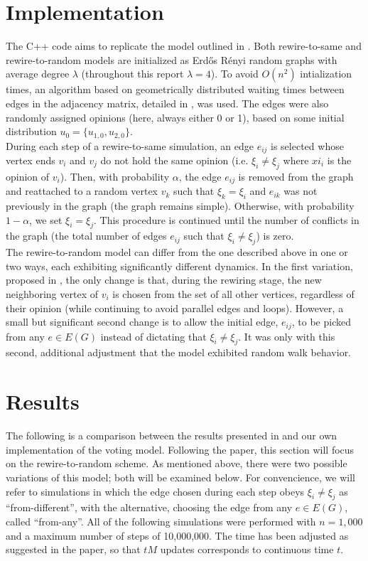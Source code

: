 \documentclass[11pt]{article}
\begin{document}
\section*{Implementation}
The C++ code aims to replicate the model outlined in \cite{durret:pnas12}. Both rewire-to-same and rewire-to-random models are initialized as Erd\H{o}s R\'{e}nyi random graphs with average degree $\lambda$ (throughout this report $\lambda = 4$). To avoid $O(n^{2})$ intialization times, an algorithm based on geometrically distributed waiting times between edges in the adjacency matrix, detailed in \cite{?}, was used. The edges were also randomly assigned opinions (here, always either 0 or 1), based on some initial distribution $u_{0}=\{u_{1,0},u_{2,0}\}$. \\[1pt]
\indent During each step of a rewire-to-same simulation, an edge $e_{ij}$ is selected whose vertex ends $v_{i}$ and $v_{j}$ do not hold the same opinion (i.e. $\xi_{i}\neq\xi_{j}$ where $xi_{i}$ is the opinion of $v_{i}$). Then, with probability $\alpha$, the edge $e_{ij}$ is removed from the graph and reattached to a random vertex $v_{k}$ such that $\xi_{k}=\xi_{i}$ and $e_{ik}$ was not previously in the graph (the graph remains simple). Otherwise, with probability $1-\alpha$, we set $\xi_{i}=\xi_{j}$. This procedure is continued until the number of conflicts in the graph (the total number of edges $e_{ij}$ such that $\xi_{i}\neq\xi_{j}$) is zero. \\[1pt]
\indent The rewire-to-random model can differ from the one described above in one or two ways, each exhibiting significantly different dynamics. In the first variation, proposed in \cite{durret:pnas12}, the only change is that, during the rewiring stage, the new neighboring vertex of $v_{i}$ is chosen from the set of all other vertices, regardless of their opinion (while continuing to avoid parallel edges and loops). However, a small but significant second change is to allow the initial edge, $e_{ij}$, to be picked from any $e\in E(G)$ instead of dictating that $\xi_{i}\neq\xi_{j}$.  It was only with this second, additional adjustment that the model exhibited random walk behavior.
\section*{Results}

The following is a comparison between the results presented in \cite{durret:pnas12} and our own implementation of the voting model. Following the paper, this section will focus on the rewire-to-random scheme. As mentioned above, there were two possible variations of this model; both will be examined below. For convencience, we will refer to simulations in which the edge chosen during each step obeys $\xi_{i}\neq\xi_{j}$ as ``from-different'', with the alternative, choosing the edge from any $e\in E(G)$, called ``from-any''. All of the following simulations were performed with $n=1,000$ and a maximum number of steps of 10,000,000. The time has been adjusted as suggested in the paper, so that $tM$ updates corresponds to continuous time $t$.
\end{document}
